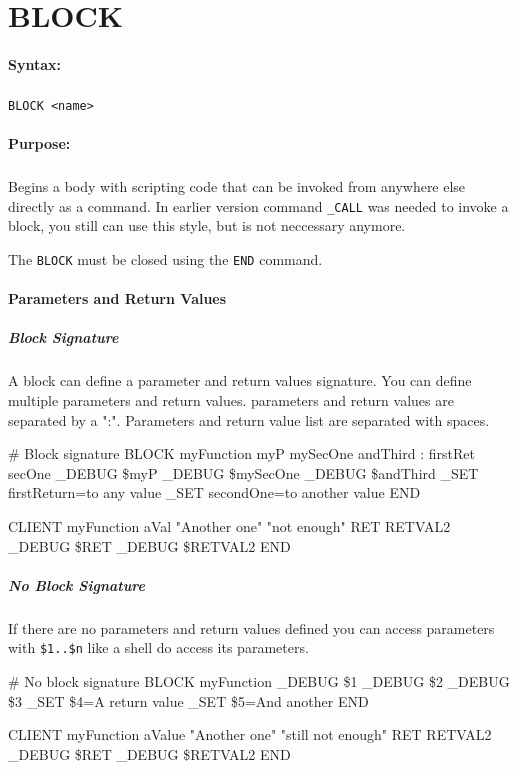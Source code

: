 
\newpage
\section{BLOCK}
\label{cmd:BLOCK}

\paragraph{Syntax:}
\subparagraph{}
\texttt{BLOCK <name>}

\paragraph{Purpose:}
\subparagraph{}
Begins a body with scripting code that can be invoked from anywhere 
else directly as a command. In earlier version command \texttt{\_CALL} was
needed to invoke a block, you still can use this style, but is not 
neccessary anymore.

The \texttt{BLOCK} must be closed using the \texttt{END} command.

\paragraph{Parameters and Return Values}
\subparagraph{Block Signature}
A block can define a parameter and return values signature. You can define 
multiple parameters and return values. parameters and return values are 
separated by a ":". Parameters and return value list are separated with spaces.
\begin{usplisting}
    # Block signature
    BLOCK myFunction myP mySecOne andThird : firstRet secOne
      _DEBUG \$myP
      _DEBUG \$mySecOne
      _DEBUG \$andThird
      _SET firstReturn=to any value
      _SET secondOne=to another value
    END 

    CLIENT
      myFunction aVal "Another one" "not enough" RET RETVAL2
      _DEBUG \$RET
      _DEBUG \$RETVAL2
    END
\end{usplisting}

\subparagraph{No Block Signature}
If there are no parameters and return values defined you can access parameters
with \texttt{\$1..\$n} like a shell do access its parameters.
\begin{usplisting}
    # No block signature
    BLOCK myFunction
      _DEBUG \$1
      _DEBUG \$2
      _DEBUG \$3
      _SET \$4=A return value
      _SET \$5=And another
    END

    CLIENT
      myFunction aValue "Another one" "still not enough" RET RETVAL2
      _DEBUG \$RET
      _DEBUG \$RETVAL2
    END
\end{usplisting}

